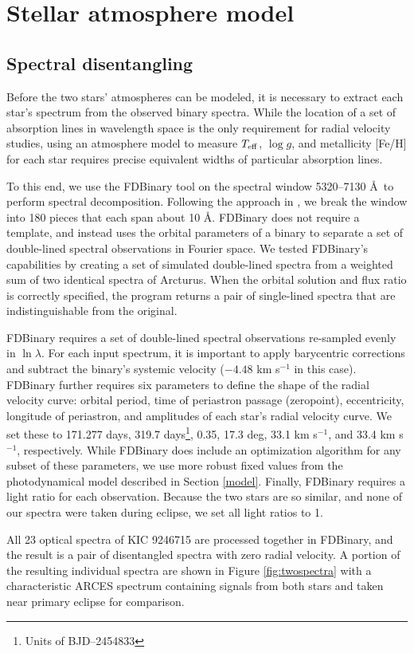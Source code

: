 \section{Stellar atmosphere model}\label{atm}

\subsection{Spectral disentangling}\label{disentangle}
Before the two stars' atmospheres can be modeled, it is necessary to extract each star's spectrum from the observed binary spectra. While the location of a set of absorption lines in wavelength space is the only requirement for radial velocity studies, using an atmosphere model to measure $T_{\rm{eff}}$, $\log g$, and metallicity [Fe/H] for each star requires precise equivalent widths of particular absorption lines.

To this end, we use the FDBinary tool \citep{ili04} on the spectral window 5320--7130 \AA \ to perform spectral decomposition. Following the approach in \citet{bec14}, we break the window into 180 pieces that each span about 10 \AA. FDBinary does not require a template, and instead uses the orbital parameters of a binary to separate a set of double-lined spectral observations in Fourier space. We tested FDBinary's capabilities by creating a set of simulated double-lined spectra from a weighted sum of two identical spectra of Arcturus. When the orbital solution and flux ratio is correctly specified, the program returns a pair of single-lined spectra that are indistinguishable from the original.

FDBinary requires a set of double-lined spectral observations re-sampled evenly in $\ln \lambda$. For each input spectrum, it is important to apply barycentric corrections and subtract the binary's systemic velocity ($-4.48$ km s$^{-1}$ in this case). FDBinary further requires six parameters to define the shape of the radial velocity curve: orbital period, time of periastron passage (zeropoint), eccentricity, longitude of periastron, and amplitudes of each star's radial velocity curve. We set these to 171.277 days, 319.7 days\footnote{Units of BJD--2454833}, 0.35, 17.3 deg, 33.1 km s$^{-1}$, and 33.4 km s$^{-1}$, respectively. While FDBinary does include an optimization algorithm for any subset of these parameters, we use more robust fixed values from the photodynamical model described in Section \ref{model}. Finally, FDBinary requires a light ratio for each observation. Because the two stars are so similar, and none of our spectra were taken during eclipse, we set all light ratios to 1.

All 23 optical spectra of KIC 9246715 are processed together in FDBinary, and the result is a pair of disentangled spectra with zero radial velocity. A portion of the resulting individual spectra are shown in Figure \ref{fig:twospectra} with a characteristic ARCES spectrum containing signals from both stars and taken near primary eclipse for comparison.

    
    